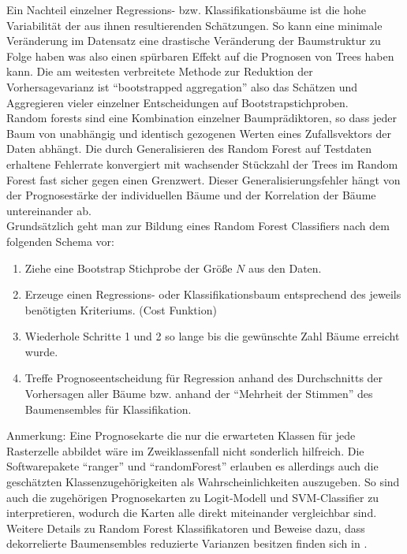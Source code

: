 Ein Nachteil einzelner Regressions- bzw. Klassifikationsbäume ist die hohe Variabilität der aus ihnen resultierenden Schätzungen. So kann eine minimale Veränderung im Datensatz eine drastische Veränderung der Baumstruktur zu Folge haben was also einen spürbaren Effekt auf die Prognosen von Trees haben kann. Die am weitesten verbreitete Methode zur Reduktion der Vorhersagevarianz ist ``bootstrapped aggregation'' also das Schätzen und Aggregieren vieler einzelner Entscheidungen auf Bootstrapstichproben. \\
Random forests sind eine Kombination einzelner Baumprädiktoren, so dass jeder Baum von unabhängig und identisch gezogenen Werten eines Zufallsvektors der Daten abhängt. Die durch Generalisieren des Random Forest auf Testdaten erhaltene Fehlerrate konvergiert mit wachsender Stückzahl der Trees im Random Forest fast sicher gegen einen Grenzwert. Dieser Generalisierungsfehler hängt von der Prognosestärke der individuellen Bäume und der Korrelation der Bäume untereinander ab. \cite{randomforest}\\
Grundsätzlich geht man zur Bildung eines Random Forest Classifiers nach dem folgenden Schema vor:
\begin{enumerate}
    \item Ziehe eine Bootstrap Stichprobe der Größe $N$ aus den Daten.
    \item Erzeuge einen Regressions- oder Klassifikationsbaum entsprechend des jeweils benötigten Kriteriums. (Cost Funktion)
    \item Wiederhole Schritte 1 und 2 so lange bis die gewünschte Zahl Bäume erreicht wurde. 
    \item Treffe Prognoseentscheidung für Regression anhand des Durchschnitts der Vorhersagen aller Bäume bzw. anhand der ``Mehrheit der Stimmen'' des Baumensembles für Klassifikation. 
\end{enumerate}
Anmerkung: Eine Prognosekarte die nur die erwarteten Klassen für jede Rasterzelle abbildet wäre im Zweiklassenfall nicht sonderlich hilfreich. Die Softwarepakete ``ranger'' \cite{ranger} und ``randomForest'' \cite{forestpackage} erlauben es allerdings auch die geschätzten Klassenzugehörigkeiten als Wahrscheinlichkeiten auszugeben. So sind auch die zugehörigen Prognosekarten zu Logit-Modell und SVM-Classifier zu interpretieren, wodurch die Karten alle direkt miteinander vergleichbar sind. Weitere Details zu Random Forest Klassifikatoren und Beweise dazu, dass dekorrelierte Baumensembles reduzierte Varianzen besitzen finden sich in \cite{randomforest}. 

